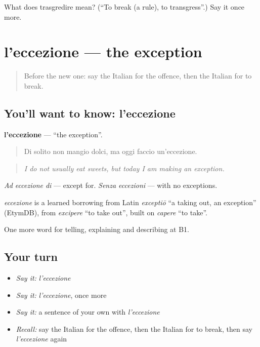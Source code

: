 \begin{tcolorbox}[breakable,colback=teal!4,colframe=teal!35!black,title={Before you move on}]
What does trasgredire mean? (\textquotedblleft{}To break (a rule), to transgress\textquotedblright{}.) Say it once more.
\end{tcolorbox}
\section[l'eccezione]{l'eccezione — the exception}

\label{lesson:IT-C386-eccezione}



\begin{quote}
Before the new one: say the Italian for the offence, then the Italian for to break.
\end{quote}

\subsection*{You'll want to know: l'eccezione}
\textbf{l'eccezione} — \textquotedblleft{}the exception\textquotedblright{}.

\begin{quote}
Di solito non mangio dolci, ma oggi faccio un'eccezione.
\end{quote}

\begin{quote}
\emph{I do not usually eat sweets, but today I am making an exception.}
\end{quote}

\emph{Ad eccezione di} — except for. \emph{Senza eccezioni} — with no exceptions.

\begin{cousinweb}
\emph{eccezione} is a learned borrowing from Latin \emph{exceptiō} \textquotedblleft{}a taking out, an exception\textquotedblright{} (EtymDB), from \emph{excipere} \textquotedblleft{}to take out\textquotedblright{}, built on \emph{capere} \textquotedblleft{}to take\textquotedblright{}.
\end{cousinweb}

\begin{grammarlens}[title={What you've built}]
One more word for telling, explaining and describing at B1.
\end{grammarlens}

\subsection*{Your turn}
\begin{itemize}
\raggedright
  \item \emph{Say it:} \emph{l'eccezione}
  \item \emph{Say it:} \emph{l'eccezione}, once more
  \item \emph{Say it:} a sentence of your own with \emph{l'eccezione}
  \item \emph{Recall:} say the Italian for the offence, then the Italian for to break, then say \emph{l'eccezione} again
\end{itemize}


